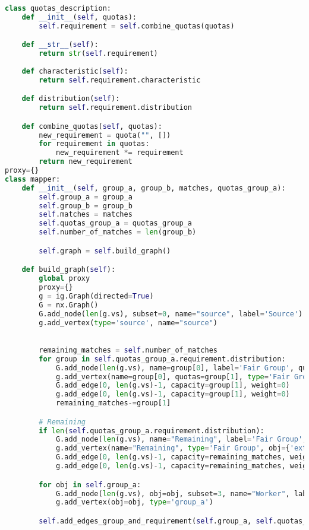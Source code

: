 \begin{apendicesenv}
\begin{lstlisting}[language=Python, caption={Fair Bipartite Matching Solver Source Code}]
class quotas_description:
    def __init__(self, quotas):
        self.requirement = self.combine_quotas(quotas)

    def __str__(self):
        return str(self.requirement)
    
    def characteristic(self):
        return self.requirement.characteristic

    def distribution(self):
        return self.requirement.distribution

    def combine_quotas(self, quotas):
        new_requirement = quota("", [])
        for requirement in quotas:
            new_requirement *= requirement
        return new_requirement
proxy={}
class mapper:
    def __init__(self, group_a, group_b, matches, quotas_group_a):
        self.group_a = group_a
        self.group_b = group_b
        self.matches = matches
        self.quotas_group_a = quotas_group_a
        self.number_of_matches = len(group_b)

        self.graph = self.build_graph()

    def build_graph(self):
        global proxy
        proxy={}
        g = ig.Graph(directed=True)
        G = nx.Graph()
        G.add_node(len(g.vs), subset=0, name="source", label='Source')
        g.add_vertex(type='source', name="source")

        
        remaining_matches = self.number_of_matches
        for group in self.quotas_group_a.requirement.distribution:
            G.add_node(len(g.vs), name=group[0], label='Fair Group', quotas=group[1], subset=1, obj=group)
            g.add_vertex(name=group[0], quotas=group[1], type='Fair Group', obj=group)
            G.add_edge(0, len(g.vs)-1, capacity=group[1], weight=0)
            g.add_edge(0, len(g.vs)-1, capacity=group[1], weight=0)
            remaining_matches-=group[1]

        # Remaining
        if len(self.quotas_group_a.requirement.distribution):
            G.add_node(len(g.vs), name="Remaining", label='Fair Group', subset=1, obj={'extra': True})
            g.add_vertex(name="Remaining", type='Fair Group', obj={'extra': True})
            G.add_edge(0, len(g.vs)-1, capacity=remaining_matches, weight=0)
            g.add_edge(0, len(g.vs)-1, capacity=remaining_matches, weight=0)

        for obj in self.group_a:
            G.add_node(len(g.vs), obj=obj, subset=3, name="Worker", label='Worker')
            g.add_vertex(obj=obj, type='group_a')

        self.add_edges_group_and_requirement(self.group_a, self.quotas_group_a, 0, g, G)



\end{lstlisting}
\end{apendicesenv}
